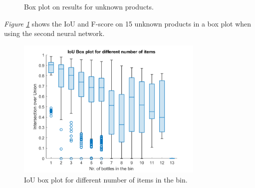 \clearpage

\begin{figure}[h]
 \centering
 \hfill
 
 \caption{Box plot on results for unknown products.}
 \label{fig:v2unknowniou}
\end{figure}

\textit{Figure \ref{fig:v2unknowniou}} shows the IoU and F-score on 15 unknown products in a box plot when using the second neural network.

\begin{figure}[h]
 \centering
 \includegraphics[width=0.8\textwidth]{graphics/results/v2boxplotBottles.png}
 \caption{IoU box plot for different number of items in the bin.}
 \label{fig:v2bottles}
\end{figure}

